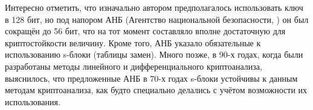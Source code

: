 Интересно отметить, что изначально автором предполагалось использовать ключ в 128 бит, но под напором АНБ (Агентство национальной безопасности, ) он был сокращён до 56 бит, что на тот момент составляло вполне достаточную для криптостойкости величину. Кроме того, АНБ указало обязательные к использованию s-блоки (таблицы замен). Много позже, в 90-х годах, когда были разработаны методы линейного и дифференциального криптоанализа, выяснилось, что предложенные АНБ в 70-х годах s-блоки устойчивы к данным методам криптоанализа, как будто специально делались с учётом возможности их использования.

